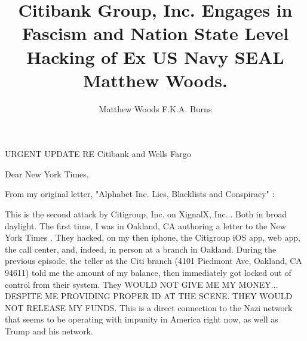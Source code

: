 \documentclass[a4paper]{arthur-letter}
\title{Citibank Group, Inc. Engages in Fascism and Nation State Level Hacking of Ex US Navy SEAL Matthew Woods.}
\author{Matthew Woods F.K.A. Burns}
\begin{document}
    \makeprofile %
    
    \address{Matthew Woods,\\PO Box 376\\Mountain View, CA, 94042}

    \begin{letter}

    \subject{TLDR: I'm a former Navy SEAL, smeared by Dianna Cowern (AKA Physics Girl) via Alphabet Inc. while working as a Google employee. From 2015-2020, I have experienced severe police misconduct first hand. This is across five counties: San Diego, Orange, Santa Clara, Oahu and Hawaii. I think they may have ties to THE Nazis, since my entire immediate family (Donald Burns, Anne Burns and Susan Burns) are Nazis... the type that agree with Adolf Hitler and Eichmann of WWII. They lied to me about this since I was born. Target Corporation, local strip malls and police succumb to fascism and try to suppress me in all ways. on top of that, Citigroup Inc. and Wells Fargo launch denial of service attacks to me and XignalX Inc: a struggling startup owned by disabled former US Navy SEALs in Hawaii. Nation state level hacking is apparent.
}
            
    URGENT UPDATE RE Citibank and Wells Fargo
            
    \opening{Dear New York Times,}
            
    From my original letter, "Alphabet Inc. Lies, Blacklists and Conspiracy" \cite{alphabetinc}:

    This is the second attack by Citigroup, Inc. on XignalX, Inc... Both in broad daylight. The first time, I was in Oakland, CA authoring a letter to the New York Times \cite{alphabetinc}. They hacked, on my then iphone, the Citigroup iOS app, web app, the call center, and, indeed, in person at a branch in Oakland. During the previous episode, the teller at the Citi branch (4101 Piedmont Ave, Oakland, CA 94611) told me the amount of my balance, then immediately got locked out of control from their system. They WOULD NOT GIVE ME MY MONEY... DESPITE ME PROVIDING PROPER ID AT THE SCENE. THEY WOULD NOT RELEASE MY FUNDS. This is a direct connection to the Nazi network that seems to be operating with impunity in America right now, as well as Trump and his network.


\end{letter}
\end{document}
